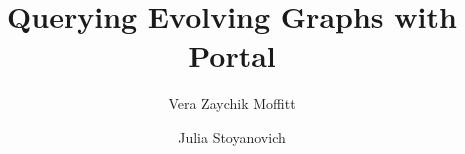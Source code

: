 \documentclass[twocolumn]{svjour3}
\begin{document}
\title{Querying Evolving Graphs with Portal}

\author{Vera Zaychik Moffitt \and Julia Stoyanovich}
%

\maketitle

\thispagestyle{empty}


%



%
%

%



\end{document}

